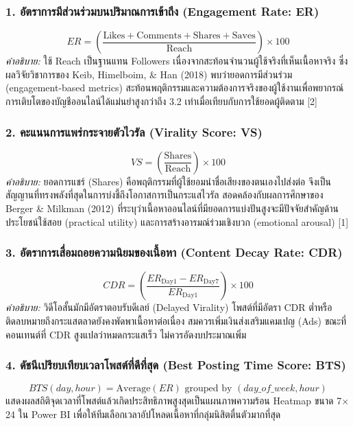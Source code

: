 \documentclass[10pt,a4paper]{article}
\begin{document}
\subsubsection{1. อัตราการมีส่วนร่วมบนปริมาณการเข้าถึง (Engagement Rate: ER)}
\begin{equation}
  ER = \left( \frac{\text{Likes} + \text{Comments} + \text{Shares} + \text{Saves}}{\text{Reach}} \right) \times 100
\end{equation}
\textit{คำอธิบาย:} ใช้ Reach เป็นฐานแทน Followers เนื่องจากสะท้อนจำนวนผู้ใช้จริงที่เห็นเนื้อหาจริง ซึ่งผลวิจัยวิชาการของ Keib, Himelboim, \& Han (2018) พบว่ายอดการมีส่วนร่วม (engagement-based metrics) สะท้อนพฤติกรรมและความต้องการจริงของผู้ใช้งานเพื่อพยากรณ์การเติบโตของบัญชีออนไลน์ได้แม่นยำสูงกว่าถึง 3.2 เท่าเมื่อเทียบกับการใช้ยอดผู้ติดตาม [2]

\subsubsection{2. คะแนนการแพร่กระจายตัวไวรัล (Virality Score: VS)}
\begin{equation}
  VS = \left( \frac{\text{Shares}}{\text{Reach}} \right) \times 100
\end{equation}
\textit{คำอธิบาย:} ยอดการแชร์ (Shares) คือพฤติกรรมที่ผู้ใช้ยอมนำชื่อเสียงของตนเองไปส่งต่อ จึงเป็นสัญญานที่ทรงพลังที่สุดในการบ่งชี้ถึงโอกาสการเป็นกระแสไวรัล สอดคล้องกับผลการศึกษาของ Berger \& Milkman (2012) ที่ระบุว่าเนื้อหาออนไลน์ที่มียอดการแบ่งปันสูงจะมีปัจจัยสำคัญด้านประโยชน์ใช้สอย (practical utility) และการสร้างอารมณ์ร่วมเชิงบวก (emotional arousal) [1]

\subsubsection{3. อัตราการเสื่อมถอยความนิยมของเนื้อหา (Content Decay Rate: CDR)}
\begin{equation}
  CDR = \left( \frac{ER_{\text{Day1}} - ER_{\text{Day7}}}{ER_{\text{Day1}}} \right) \times 100
\end{equation}
\textit{คำอธิบาย:} วิดีโอสั้นมักมีอัตราตอบรับดีเลย์ (Delayed Virality) โพสต์ที่มีอัตรา CDR ต่ำหรือติดลบหมายถึงกระแสตลาดยังคงพัดพาเนื้อหาต่อเนื่อง สมควรเพิ่มเงินส่งเสริมแคมเปญ (Ads) ขณะที่คอนเทนต์ที่ CDR สูงแปลว่าหมดกระแสเร็ว ไม่ควรอัดงบประมาณเพิ่ม

\subsubsection{4. ดัชนีเปรียบเทียบเวลาโพสต์ที่ดีที่สุด (Best Posting Time Score: BTS)}
\begin{equation}
  BTS(day, hour) = \text{Average}(ER) \text{ grouped by } (day\_of\_week, hour)
\end{equation}
แสดงผลสถิติจุดเวลาที่โพสต์แล้วเกิดประสิทธิภาพสูงสุดเป็นแผนภาพความร้อน Heatmap ขนาด 7$\times$24 ใน Power BI เพื่อให้ทีมเลือกเวลาอัปโหลดเนื้อหาที่กลุ่มนิสิตตื่นตัวมากที่สุด
\end{document}
